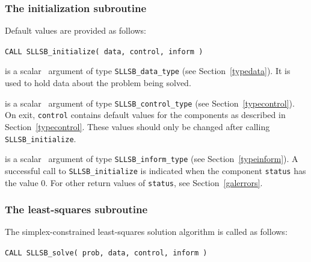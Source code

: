 \documentclass{galahad}
\newcommand{\packagename}{SLLSB}
\begin{document}

\subsubsection{The initialization subroutine}\label{subinit}
 Default values are provided as follows:
\vspace*{1mm}

\hspace{8mm}
{\tt CALL \packagename\_initialize( data, control, inform )}

\vspace*{-3mm}
\begin{description}

 is a scalar \intentinout\ argument of type
{\tt \packagename\_data\_type}
(see Section~\ref{typedata}). It is used to hold data about the problem being
solved.

 is a scalar \intentout\ argument of type
{\tt \packagename\_control\_type}
(see Section~\ref{typecontrol}).
On exit, {\tt control} contains default values for the components as
described in Section~\ref{typecontrol}.
These values should only be changed after calling
{\tt \packagename\_initialize}.

 is a scalar \intentout\ argument of type
{\tt \packagename\_inform\_type}
(see Section~\ref{typeinform}). A successful call to
{\tt \packagename\_initialize}
is indicated when the  component {\tt status} has the value 0.
For other return values of {\tt status}, see Section~\ref{galerrors}.

\end{description}


\subsubsection{The least-squares subroutine}\label{qps}
The simplex-constrained least-squares solution algorithm is called as follows:
\vspace*{1mm}

\hspace{8mm}
{\tt CALL \packagename\_solve( prob, data, control, inform )}
\end{document}
